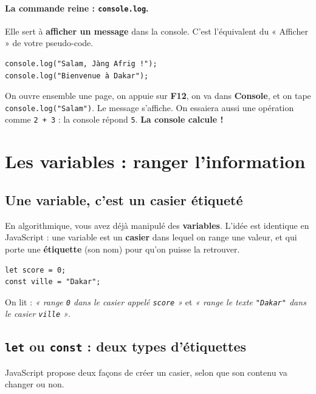 \documentclass[11pt,a4paper]{article}
\newcommand{\code}[1]{\texttt{#1}}
\begin{document}
\paragraph{La commande reine : \code{console.log}.} Elle sert à \textbf{afficher un message} dans la console. C'est l'équivalent du « Afficher » de votre pseudo-code.

\begin{lstlisting}[style=js]
console.log("Salam, Jàng Afrig !");
console.log("Bienvenue à Dakar");
\end{lstlisting}

\begin{infobox}
On ouvre ensemble une page, on appuie sur \textbf{F12}, on va dans \textbf{Console}, et on tape \code{console.log("Salam")}. Le message s'affiche. On essaiera aussi une opération comme \code{2 + 3} : la console répond \code{5}. \textbf{La console calcule !}
\end{infobox}

\section{Les variables : ranger l'information}

\subsection{Une variable, c'est un casier étiqueté}

En algorithmique, vous avez déjà manipulé des \textbf{variables}. L'idée est identique en JavaScript : une variable est un \textbf{casier} dans lequel on range une valeur, et qui porte une \textbf{étiquette} (son nom) pour qu'on puisse la retrouver.

\begin{lstlisting}[style=js]
let score = 0;
const ville = "Dakar";
\end{lstlisting}

On lit : \emph{« range \code{0} dans le casier appelé \code{score} »} et \emph{« range le texte \code{"Dakar"} dans le casier \code{ville} »}.

\subsection{\code{let} ou \code{const} : deux types d'étiquettes}

JavaScript propose deux façons de créer un casier, selon que son contenu va changer ou non.
\end{document}

